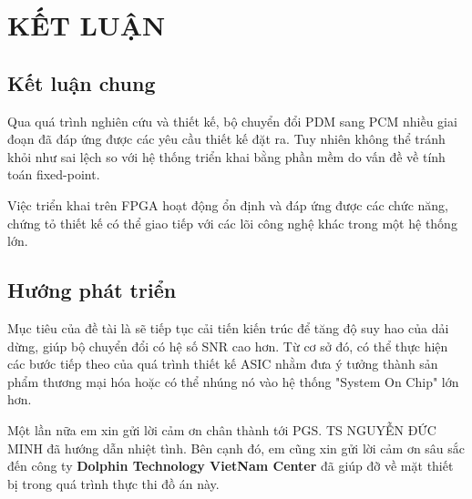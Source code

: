 \section*{KẾT LUẬN} \label{ketluan}
\subsection*{Kết luận chung}

Qua quá trình nghiên cứu và thiết kế, bộ chuyển đổi PDM sang PCM nhiều giai đoạn đã đáp ứng được các yêu cầu thiết kế đặt ra. Tuy nhiên không thể tránh khỏi như sai lệch so với hệ thống triển khai bằng phần mềm do vấn đề về tính toán fixed-point.

Việc triển khai trên FPGA hoạt động ổn định và đáp ứng được các chức năng, chứng tỏ thiết kế có thể giao tiếp với các lõi công nghệ khác trong một hệ thống lớn.

\subsection*{Hướng phát triển}
Mục tiêu của đề tài là sẽ tiếp tục cải tiến kiến trúc để tăng độ suy hao của dải dừng, giúp bộ chuyển đổi có hệ số SNR cao hơn. Từ cơ sở đó, có thể thực hiện các bước tiếp theo của quá trình thiết kế ASIC nhằm đưa ý tưởng thành sản phẩm thương mại hóa hoặc có thể nhúng nó vào hệ thống "System On Chip" lớn hơn.


Một lần nữa em xin gửi lời cảm ơn chân thành tới PGS. TS NGUYỄN ĐỨC MINH đã hướng dẫn nhiệt tình. Bên cạnh đó, em cũng xin gửi lời cảm ơn sâu sắc đến công ty \textbf{Dolphin Technology VietNam Center} đã giúp đỡ về mặt thiết bị trong quá trình thực thi đồ án này.

\newpage